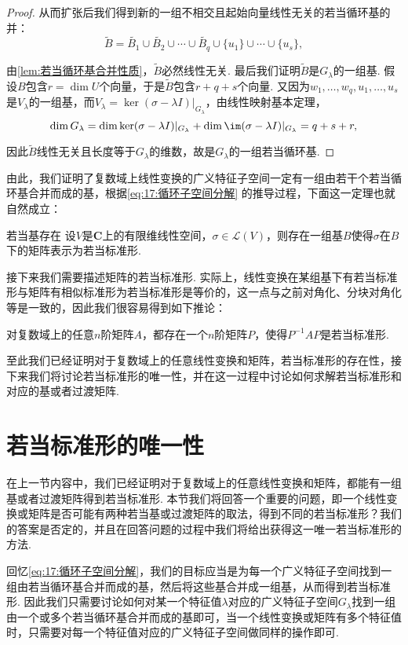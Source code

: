 \begin{proof}
    从而扩张后我们得到新的一组不相交且起始向量线性无关的若当循环基的并：
    \[\tilde{B}=\tilde{B_1}\cup\tilde{B_2}\cup\cdots\cup\tilde{B_q}\cup\{u_1\}\cup\cdots\cup\{u_s\},\]

    由\autoref{lem:若当循环基合并性质}，$\tilde{B}$必然线性无关. 最后我们证明$\tilde{B}$是$G_\lambda$的一组基. 假设$B$包含$r=\dim U$个向量，于是$\tilde{B}$包含$r+q+s$个向量. 又因为$w_1,\ldots,w_q,u_1,\ldots,u_s$是$V_\lambda$的一组基，而$V_\lambda=\ker(\sigma-\lambda I)\vert_{G_\lambda}$，由线性映射基本定理，
    \[\dim G_\lambda=\dim\ker(\sigma-\lambda I)\vert_{G_\lambda}+\dim\im(\sigma-\lambda I)\vert_{G_\lambda}=q+s+r,\]

    因此$\tilde{B}$线性无关且长度等于$G_\lambda$的维数，故是$G_\lambda$的一组若当循环基.
\end{proof}

由此，我们证明了复数域上线性变换的广义特征子空间一定有一组由若干个若当循环基合并而成的基，根据\autoref{eq:17:循环子空间分解} 的推导过程，下面这一定理也就自然成立：
\begin{corollary}{}{若当基存在}
    设$V$是$\mathbf{C}$上的有限维线性空间，$\sigma\in\mathcal{L}(V)$，则存在一组基$B$使得$\sigma$在$B$下的矩阵表示为若当标准形.
\end{corollary}

接下来我们需要描述矩阵的若当标准形. 实际上，线性变换在某组基下有若当标准形与矩阵有相似标准形为若当标准形是等价的，这一点与之前对角化、分块对角化等是一致的，因此我们很容易得到如下推论：
\begin{corollary}{}{}
    对复数域上的任意$n$阶矩阵$A$，都存在一个$n$阶矩阵$P$，使得$P^{-1}AP$是若当标准形.
\end{corollary}

至此我们已经证明对于复数域上的任意线性变换和矩阵，若当标准形的存在性，接下来我们将讨论若当标准形的唯一性，并在这一过程中讨论如何求解若当标准形和对应的基或者过渡矩阵.

\section{若当标准形的唯一性}

在上一节内容中，我们已经证明对于复数域上的任意线性变换和矩阵，都能有一组基或者过渡矩阵得到若当标准形. 本节我们将回答一个重要的问题，即一个线性变换或矩阵是否可能有两种若当基或过渡矩阵的取法，得到不同的若当标准形？我们的答案是否定的，并且在回答问题的过程中我们将给出获得这一唯一若当标准形的方法.

回忆\autoref{eq:17:循环子空间分解}，我们的目标应当是为每一个广义特征子空间找到一组由若当循环基合并而成的基，然后将这些基合并成一组基，从而得到若当标准形. 因此我们只需要讨论如何对某一个特征值$\lambda$对应的广义特征子空间$G_\lambda$找到一组由一个或多个若当循环基合并而成的基即可，当一个线性变换或矩阵有多个特征值时，只需要对每一个特征值对应的广义特征子空间做同样的操作即可.

